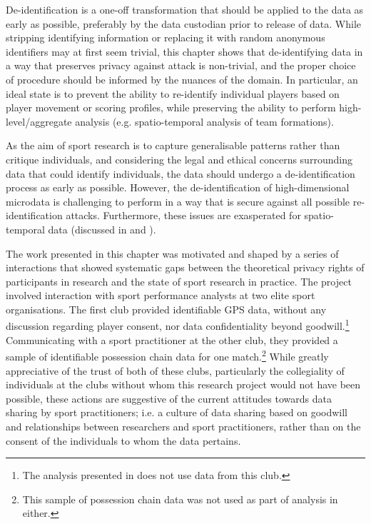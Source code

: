 De-identification is a one-off transformation that should be applied to the data as early as possible, preferably by the data custodian prior to release of data. While stripping identifying information or replacing it with random anonymous identifiers may at first seem trivial, this chapter shows that de-identifying data in a way that preserves privacy against attack is non-trivial, and the proper choice of procedure should be informed by the nuances of the domain. In particular, an ideal state is to prevent the ability to re-identify individual players based on player movement or scoring profiles, while preserving the ability to perform high-level/aggregate analysis (e.g. spatio-temporal analysis of team formations).

As the aim of sport research is to capture generalisable patterns rather than critique individuals, and considering the legal and ethical concerns surrounding data that could identify individuals, the data should undergo a de-identification process as early as possible. However, the de-identification of high-dimensional microdata is challenging to perform in a way that is secure against all possible re-identification attacks. Furthermore, these issues are exasperated for spatio-temporal data (discussed in  and ).

The work presented in this chapter was motivated and shaped by a series of interactions that showed systematic gaps between the theoretical privacy rights of participants in research and the state of sport research in practice. The project involved interaction with sport performance analysts at two elite sport organisations. The first club provided identifiable GPS data, without any discussion regarding player consent, nor data confidentiality beyond goodwill.\footnote{The analysis presented in  does not use data from this club.} Communicating with a sport practitioner at the other club, they provided a sample of identifiable possession chain data for one match.\footnote{This sample of possession chain data was not used as part of analysis in  either.} While greatly appreciative of the trust of both of these clubs, particularly the collegiality of individuals at the clubs without whom this research project would not have been possible, these actions are suggestive of the current attitudes towards data sharing by sport practitioners; i.e. a culture of data sharing based on goodwill and relationships between researchers and sport practitioners, rather than on the consent of the individuals to whom the data pertains.

